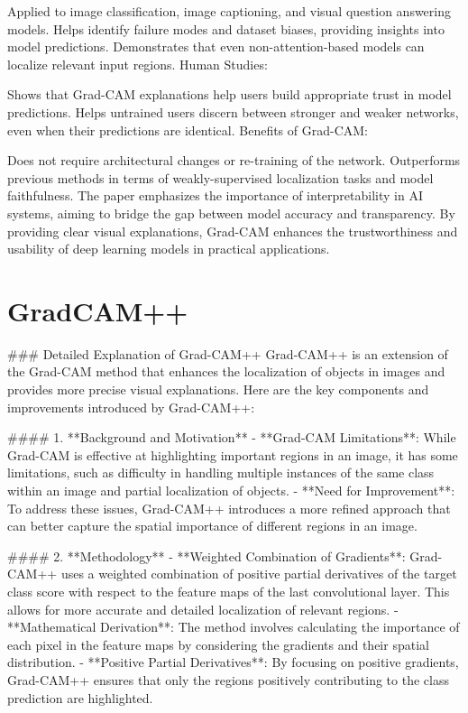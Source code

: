 Applied to image classification, image captioning, and visual question answering models.
Helps identify failure modes and dataset biases, providing insights into model predictions.
Demonstrates that even non-attention-based models can localize relevant input regions.
Human Studies:

Shows that Grad-CAM explanations help users build appropriate trust in model predictions.
Helps untrained users discern between stronger and weaker networks, even when their predictions are identical.
Benefits of Grad-CAM:

Does not require architectural changes or re-training of the network.
Outperforms previous methods in terms of weakly-supervised localization tasks and model faithfulness.
The paper emphasizes the importance of interpretability in AI systems, aiming to bridge the gap between model accuracy and transparency. By providing clear visual explanations, Grad-CAM enhances the trustworthiness and usability of deep learning models in practical applications.

\section{GradCAM++}

### Detailed Explanation of Grad-CAM++
Grad-CAM++ is an extension of the Grad-CAM method that enhances the localization of objects in images and provides more precise visual explanations. Here are the key components and improvements introduced by Grad-CAM++:

#### 1. **Background and Motivation**
- **Grad-CAM Limitations**: While Grad-CAM is effective at highlighting important regions in an image, it has some limitations, such as difficulty in handling multiple instances of the same class within an image and partial localization of objects.
- **Need for Improvement**: To address these issues, Grad-CAM++ introduces a more refined approach that can better capture the spatial importance of different regions in an image.

#### 2. **Methodology**
- **Weighted Combination of Gradients**: Grad-CAM++ uses a weighted combination of positive partial derivatives of the target class score with respect to the feature maps of the last convolutional layer. This allows for more accurate and detailed localization of relevant regions.
  - **Mathematical Derivation**: The method involves calculating the importance of each pixel in the feature maps by considering the gradients and their spatial distribution.
  - **Positive Partial Derivatives**: By focusing on positive gradients, Grad-CAM++ ensures that only the regions positively contributing to the class prediction are highlighted.

